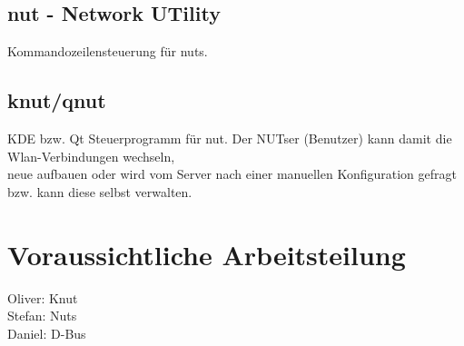 \documentclass[a4paper,10pt]{scrartcl}
\begin{document}
\subsection*{nut - Network UTility}
Kommandozeilensteuerung für nuts.
\subsection*{knut/qnut}
KDE bzw. Qt Steuerprogramm für nut. Der NUTser (Benutzer) kann damit die Wlan-Verbindungen wechseln, \\
neue aufbauen oder wird vom Server nach einer manuellen Konfiguration gefragt bzw. kann diese selbst verwalten.

\section*{Voraussichtliche Arbeitsteilung}
Oliver: Knut \\
Stefan: Nuts \\
Daniel: D-Bus
\end{document}
